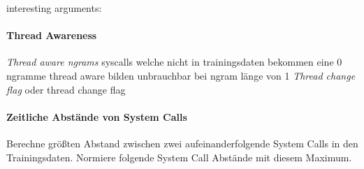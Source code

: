         interesting arguments:
        
        \paragraph{Thread Awareness}
            \textit{Thread aware ngrams}
                syscalls welche nicht in trainingsdaten bekommen eine 0
                ngramme thread aware bilden unbrauchbar bei ngram länge von 1
            \textit{Thread change flag}
                oder thread change flag

        \paragraph{Zeitliche Abstände von System Calls}
            Berechne größten Abstand zwischen zwei aufeinanderfolgende System Calls in den Trainingsdaten.
            Normiere folgende System Call Abstände mit diesem Maximum.

